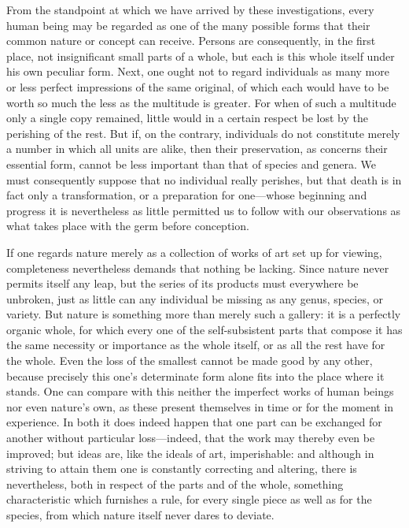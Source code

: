 \documentclass[12pt,a4paper]{article}
\begin{document}
From the standpoint at which we have arrived by these investigations, every human
being may be regarded as one of the many possible forms that their common nature
or concept can receive. Persons are consequently, in the first place, not
insignificant small parts of a whole, but each is this whole itself under his own
peculiar form. Next, one ought not to regard individuals as many more or less
perfect impressions of the same original, of which each would have to be worth so
much the less as the multitude is greater. For when of such a multitude only a
single copy remained, little would in a certain respect be lost by the perishing
of the rest. But if, on the contrary, individuals do not constitute merely a
number in which all units are alike, then their preservation, as concerns their
essential form, cannot be less important than that of species and genera. We must
consequently suppose that no individual really perishes, but that death is in
fact only a transformation, or a preparation for one---whose beginning and
progress it is nevertheless as little permitted us to follow with our
observations as what takes place with the germ before conception.

If one regards nature merely as a collection of works of art set up for viewing,
completeness nevertheless demands that nothing be lacking. Since nature never
permits itself any leap, but the series of its products must everywhere be
unbroken, just as little can any individual be missing as any genus, species, or
variety. But nature is something more than merely such a gallery: it is a
perfectly organic whole, for which every one of the self-subsistent parts that
compose it has the same necessity or importance as the whole itself, or as all the
rest have for the whole. Even the loss of the smallest cannot be made good by any
other, because precisely this one's determinate form alone fits into the place
where it stands. One can compare with this neither the imperfect works of human
beings nor even nature's own, as these present themselves in time or for the
moment in experience. In both it does indeed happen that one part can be exchanged
for another without particular loss---indeed, that the work may thereby even be
improved; but ideas are, like the ideals of art, imperishable: and although in
striving to attain them one is constantly correcting and altering, there is
nevertheless, both in respect of the parts and of the whole, something
characteristic which furnishes a rule, for every single piece as well as for the
species, from which nature itself never dares to deviate.
\end{document}

